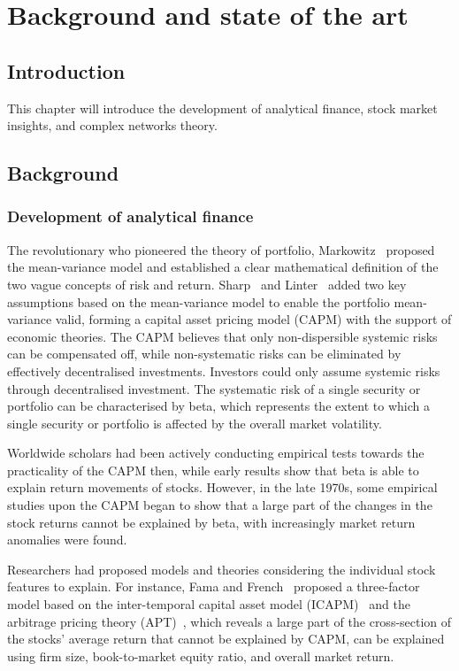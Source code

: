 \chapter[Background]{Background and state of the art}
\label{cpt:back}

\section{Introduction}
This chapter will introduce the development of analytical finance, stock market insights, and complex networks theory.

\section{Background}
\subsection{Development of analytical finance}
The revolutionary who pioneered the theory of portfolio, Markowitz~\cite{portfolio} proposed the mean-variance model and established a clear mathematical definition of the two vague concepts of risk and return. Sharp~\cite{equilibrium} and Linter~\cite{diversification} added two key assumptions based on the mean-variance model to enable the portfolio mean-variance valid, forming a capital asset pricing model (CAPM) with the support of economic theories. The CAPM believes that only non-dispersible systemic risks can be compensated off, while non-systematic risks can be eliminated by effectively decentralised investments. Investors could only assume systemic risks through decentralised investment. The systematic risk of a single security or portfolio can be characterised by beta, which represents the extent to which a single security or portfolio is affected by the overall market volatility.

Worldwide scholars had been actively conducting empirical tests towards the practicality of the CAPM then, while early results show that beta is able to explain return movements of stocks. However, in the late 1970s, some empirical studies upon the CAPM began to show that a large part of the changes in the stock returns cannot be explained by beta, with increasingly market return anomalies were found.

Researchers had proposed models and theories considering the individual stock features to explain. For instance, Fama and French~\cite{riskfactors, anomalies} proposed a three-factor model based on the inter-temporal capital asset model (ICAPM)~\cite{intertemporal} and the arbitrage pricing theory (APT)~\cite{options}, which reveals a large part of the cross-section of the stocks’ average return that cannot be explained by CAPM, can be explained using firm size, book-to-market equity ratio, and overall market return.

